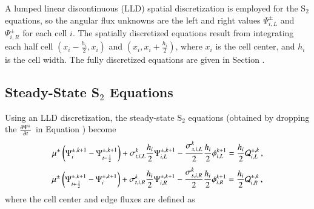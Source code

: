 \documentclass[preprint,12pt]{elsarticle}
\begin{document}
A lumped linear discontinuous (LLD) spatial discretization is employed
for the S$_2$ equations, so the angular flux
unknowns are the left and right values $\Psi_{i,L}^\pm$ and
$\Psi_{i,R}^\pm$ for each cell $i$. The spatially
discretized equations result from integrating each half cell
$(x_i-\frac{h_i}{2},x_i)$ and $(x_i,x_i+\frac{h_i}{2})$,
where $x_i$ is the cell center, and $h_i$ is the cell width.
The fully discretized equations are given in Section .

\subsection{Steady-State \texorpdfstring{S$_2$}{S-2} Equations}
Using an LLD discretization, the steady-state
S$_2$ equations (obtained by dropping the $\frac{\partial \Psi^\pm}{\partial t}$ in Equation
) become
\begin{equation}\lequ{S2ssL}
  \mu^\pm\fn{\Psi^{\pm,k+1}_i - \Psi^{\pm,k+1}_{i-\half}}
  +\sigma_{t,i,L}^k\frac{h_i}{2}\Psi\iL^{\pm,k+1}
  -\frac{\sigma_{s,i,L}^k}{2}\frac{h_i}{2}\phi\iL^{k+1}
  =\frac{h_i}{2}\Q_{i,L}^{\pm,k} \pec
\end{equation}
\begin{equation}\lequ{S2ssR}
  \mu^\pm\fn{\Psi^{\pm,k+1}_{i+\half} - \Psi^{\pm,k+1}_i}
  +\sigma_{t,i,R}^k\frac{h_i}{2}\Psi\iR^{\pm,k+1}
  -\frac{\sigma_{s,i,R}^k}{2}\frac{h_i}{2}\phi\iR^{k+1}
  =\frac{h_i}{2}\Q_{i,R}^{\pm,k} \pec
\end{equation}
where the cell center and edge fluxes are defined as
\end{document}
